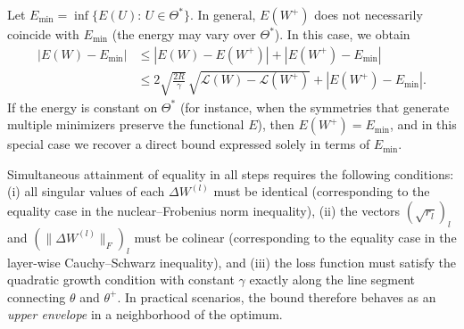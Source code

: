 \documentclass[a4paper,fleqn]{cas-sc}
\theoremstyle{remark}
\theoremstyle{definition}
\begin{document}
Let $E_{\min}=\inf\{E(U):\,U\in\Theta^*\}$. In general, $E(W^+)$ does not necessarily coincide with $E_{\min}$ (the energy may vary over $\Theta^*$). In this case, we obtain
\[
\begin{aligned}
|E(W)-E_{\min}|
&\le |E(W)-E(W^+)| + |E(W^+)-E_{\min}|\\
&\le 2\sqrt{\tfrac{2R}{\gamma}}\,\sqrt{\mathcal{L}(W)-\mathcal{L}(W^+)} + |E(W^+)-E_{\min}|.
\end{aligned}
\]
If the energy is constant on $\Theta^*$ (for instance, when the symmetries that generate multiple minimizers preserve the functional $E$), then $E(W^+)=E_{\min}$, and in this special case we recover a direct bound expressed solely in terms of $E_{\min}$.



Simultaneous attainment of equality in all steps requires the following conditions: (i) all singular values of each $\Delta W^{(l)}$ must be identical (corresponding to the equality case in the nuclear–Frobenius norm inequality), (ii) the vectors $(\sqrt{r_l})_l$ and $(\|\Delta W^{(l)}\|_F)_l$ must be colinear (corresponding to the equality case in the layer-wise Cauchy–Schwarz inequality), and (iii) the loss function must satisfy the quadratic growth condition with constant $\gamma$ exactly along the line segment connecting $\theta$ and $\theta^+$. In practical scenarios, the bound therefore behaves as an \emph{upper envelope} in a neighborhood of the optimum.
\end{document}
